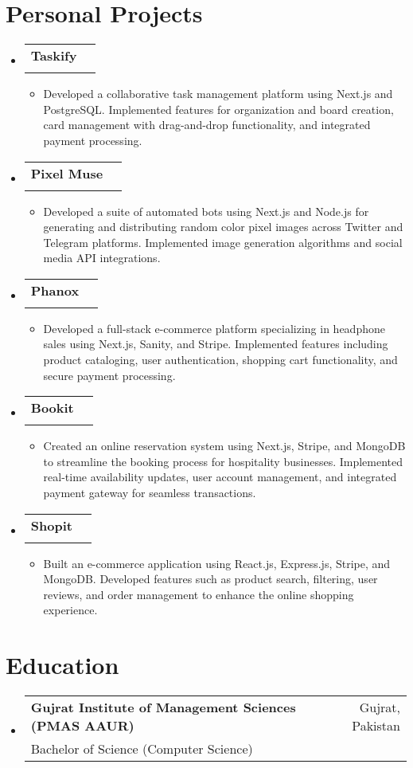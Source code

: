 \documentclass[letterpaper,11pt]{article}
\makeatletter
\newcommand{\resumeItem}[1]{
  \item[]\small{
    {#1 \vspace{-2pt}}
  }
}
\newcommand{\resumeSubheading}[4]{
  \vspace{-1pt}\item
    \begin{tabular*}{0.97\textwidth}[t]{l@{\extracolsep{\fill}}r}
      \textbf{#1} &  {\small#2} \\
      {\small#3} & {\small #4} \\
    \end{tabular*}\vspace{-6pt}
}
\newcommand{\resumeSubHeadingListStart}{\begin{itemize}[leftmargin=0.15in, label={}]}
\newcommand{\resumeSubHeadingListEnd}{\end{itemize}}
\newcommand{\resumeItemListStart}{\begin{itemize}[leftmargin=0.15in, label={}]}
\newcommand{\resumeItemListEnd}{\end{itemize}\vspace{-4pt}}
\makeatother
\begin{document}
\section{Personal Projects}
  \resumeSubHeadingListStart
    \resumeSubheading
    {Taskify}{}{}{}\vspace{-12pt}
      \resumeItemListStart
        \resumeItem{Developed a collaborative task management platform using Next.js and PostgreSQL. Implemented features for organization and board creation, card management with drag-and-drop functionality, and integrated payment processing.}
    \resumeItemListEnd
    \resumeSubheading
    {Pixel Muse}{}{}{}\vspace{-12pt}
      \resumeItemListStart
        \resumeItem{Developed a suite of automated bots using Next.js and Node.js for generating and distributing random color pixel images across Twitter and Telegram platforms. Implemented image generation algorithms and social media API integrations.}
    \resumeItemListEnd
    \resumeSubheading
    {Phanox}{}{}{}\vspace{-12pt}
      \resumeItemListStart
        \resumeItem{Developed a full-stack e-commerce platform specializing in headphone sales using Next.js, Sanity, and Stripe. Implemented features including product cataloging, user authentication, shopping cart functionality, and secure payment processing.}
    \resumeItemListEnd
      \resumeSubheading
      {Bookit}{}{}{}\vspace{-12pt}
      \resumeItemListStart
        \resumeItem{Created an online reservation system using Next.js, Stripe, and MongoDB to streamline the booking process for hospitality businesses. Implemented real-time availability updates, user account management, and integrated payment gateway for seamless transactions.}
    \resumeItemListEnd
    \resumeSubheading
    {Shopit}{}{}{}\vspace{-12pt}
      \resumeItemListStart
        \resumeItem{Built an e-commerce application using React.js, Express.js, Stripe, and MongoDB. Developed features such as product search, filtering, user reviews, and order management to enhance the online shopping experience.}
    \resumeItemListEnd
  \resumeSubHeadingListEnd

\section{Education}
  \resumeSubHeadingListStart
    \resumeSubheading
      {Gujrat Institute of Management Sciences (PMAS AAUR)}{Gujrat, Pakistan}
      {Bachelor of Science (Computer Science)}{}
  \resumeSubHeadingListEnd
\end{document}
